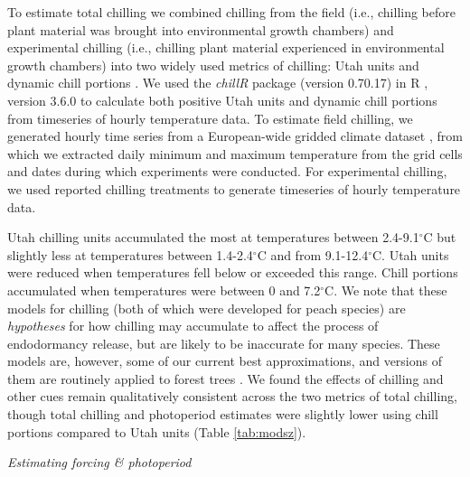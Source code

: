 \documentclass{article}
\begin{document}
\par To estimate total chilling we combined chilling from the field (i.e., chilling before plant material was brought into environmental growth chambers) and experimental chilling (i.e., chilling plant material experienced in environmental growth chambers) into two widely used metrics of chilling: Utah units and dynamic chill portions \citep{dennis2003}. We used the \textit{chillR} package (version 0.70.17) in R \citep{Rcore:2017, chillR2019}, version 3.6.0 to calculate both positive Utah units and dynamic chill portions from timeseries of hourly temperature data. To estimate field chilling, we generated hourly time series from a European-wide gridded climate dataset \citep{cornes2018}, from which we extracted daily minimum and maximum temperature from the grid cells and dates during which experiments were conducted. For experimental chilling, we used reported chilling treatments to generate timeseries of hourly temperature data.
\par Utah chilling units accumulated the most at temperatures between 2.4-9.1$^{\circ}$C but slightly less at temperatures between 1.4-2.4$^{\circ}$C and from 9.1-12.4$^{\circ}$C. Utah units were reduced when temperatures fell below or exceeded this range. Chill portions accumulated when temperatures were between 0 and 7.2$^{\circ}$C. We note that these models for chilling (both of which were developed for peach species) are \emph{hypotheses} for how chilling may accumulate to affect the process of endodormancy release, but are likely to be inaccurate for many species. These models are, however, some of our current best approximations, and versions of them are routinely applied to forest trees \citep[e.g.,][]{Harrington:2010}. We found the effects of chilling and other cues remain qualitatively consistent across the two metrics of total chilling, though total chilling and photoperiod estimates were slightly lower using chill portions compared to Utah units (Table \ref{tab:modsz}).

\par{\emph{Estimating forcing \& photoperiod}}
\end{document}
